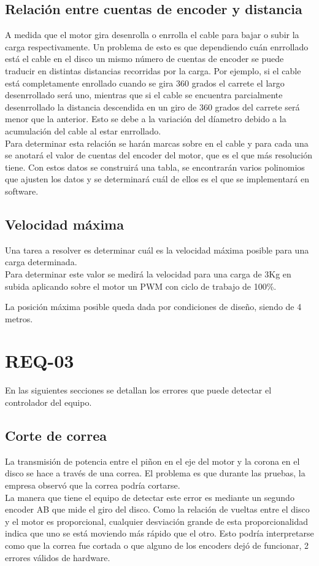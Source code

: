 \subsection{Relación entre cuentas de encoder y distancia}
A medida que el motor gira desenrolla o enrrolla el cable para bajar o subir la carga respectivamente. Un problema de esto es que dependiendo cuán enrrollado está el cable en el disco un mismo número de cuentas de encoder se puede traducir en distintas distancias recorridas por la carga. Por ejemplo, si el cable está completamente enrollado cuando se gira 360 grados el carrete el largo desenrrollado será uno, mientras que si el cable se encuentra parcialmente desenrrollado la distancia descendida en un giro de 360 grados del carrete será menor que la anterior. Esto se debe a la variación del díametro debido a la acumulación del cable al estar enrrollado.\\
Para determinar esta relación se harán marcas sobre en el cable y para cada una se anotará el valor de cuentas del encoder del motor, que es el que más resolución tiene. Con estos datos se construirá una tabla, se encontrarán varios polinomios que ajusten los datos y se determinará cuál de ellos es el que se implementará en software.

\subsection{Velocidad máxima}
Una tarea a resolver es determinar cuál es la velocidad máxima posible para una carga determinada.\\

Para determinar este valor se medirá la velocidad para una carga de 3Kg en subida aplicando sobre el motor un PWM con ciclo de trabajo de 100\%.

La posición máxima posible queda dada por condiciones de diseño, siendo de 4 metros.

\section{REQ-03} \label{sec:\thesection}
En las siguientes secciones se detallan los errores que puede detectar el controlador del equipo.

\subsection{Corte de correa}
La transmisión de potencia entre el piñon en el eje del motor y la corona en el disco se hace a través de una correa. El problema es que durante las pruebas, la empresa observó que la correa podría cortarse. \\
La manera que tiene el equipo de detectar este error es mediante un segundo encoder AB que mide el giro del disco. Como la relación de vueltas entre el disco y el motor es proporcional, cualquier desviación grande de esta proporcionalidad indica que uno se está moviendo más rápido que el otro. Esto podría interpretarse como que la correa fue cortada o que alguno de los encoders dejó de funcionar, 2 errores válidos de hardware.

